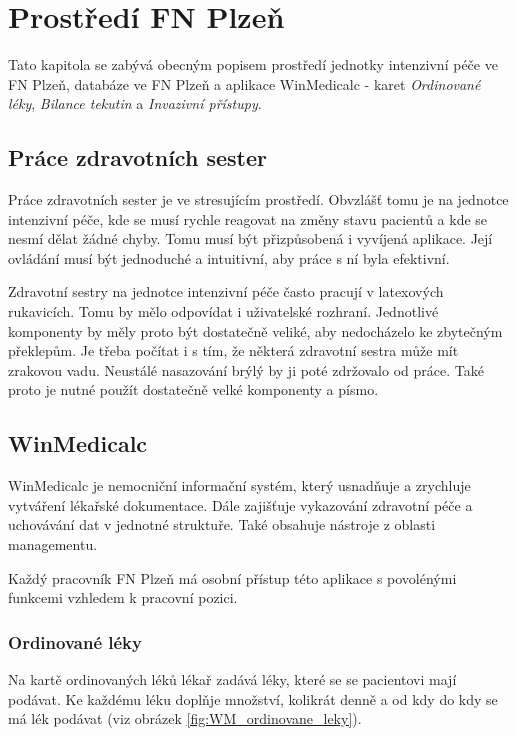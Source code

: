 \setlength{\parskip}{1em}

\chapter{Prostředí FN Plzeň}

Tato kapitola se zabývá obecným popisem prostředí jednotky intenzivní péče ve FN Plzeň, databáze ve FN Plzeň a aplikace WinMedicalc - karet \emph{Ordinované léky}, \emph{Bilance tekutin} a \emph{Invazivní přístupy}.

\section{Práce zdravotních sester}

Práce zdravotních sester je ve stresujícím prostředí. Obvzlášť tomu je na jednotce intenzivní péče, kde se musí rychle reagovat na změny stavu pacientů a kde se nesmí dělat žádné chyby. Tomu musí být přizpůsobená i vyvíjená aplikace. Její ovládání musí být jednoduché a intuitivní, aby práce s ní byla efektivní.

Zdravotní sestry na jednotce intenzivní péče často pracují v latexových rukavicích. Tomu by mělo odpovídat i uživatelské rozhraní. Jednotlivé komponenty by měly proto být dostatečně veliké, aby nedocházelo ke zbytečným překlepům. Je třeba počítat i s tím, že některá zdravotní sestra může mít zrakovou vadu. Neustálé nasazování brýlý by ji poté zdržovalo od práce. Také proto je nutné použít dostatečně velké komponenty a písmo.

\section{WinMedicalc}

WinMedicalc je nemocniční informační systém, který usnadňuje a zrychluje vytváření lékařské dokumentace. Dále zajišťuje vykazování zdravotní péče a uchovávání dat v jednotné struktuře. Také obsahuje nástroje z oblasti managementu.

Každý pracovník FN Plzeň má osobní přístup této aplikace s povolénými funkcemi vzhledem k pracovní pozici.

\subsection{Ordinované léky}

Na kartě ordinovaných léků lékař zadává léky, které se se pacientovi mají podávat. Ke každému léku doplňje množství, kolikrát denně a od kdy do kdy se má lék podávat (viz obrázek \ref{fig:WM_ordinovane_leky}).

